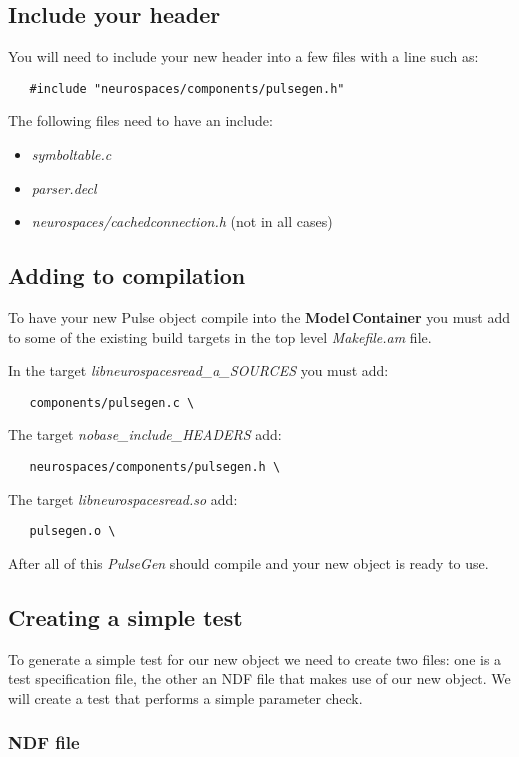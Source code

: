 \documentclass[12pt]{article}
\begin{document}
\subsection*{Include your header}

You will need to include your new header into a few files with a line such as:
\begin{verbatim}
   #include "neurospaces/components/pulsegen.h"
\end{verbatim}
The following files need to have an include:
\begin{itemize}
   \item[]{\it symboltable.c}
   \item[]{\it parser.decl}
   \item[]{\it neurospaces/cachedconnection.h} (not in all cases) 
\end{itemize}

\subsection*{Adding to compilation}

To have your new Pulse object compile into the {\bf Model\,Container} you must add to some of the existing build targets in the top level {\it Makefile.am} file.

In the target {\it libneurospacesread\_a\_SOURCES} you must add:
\begin{verbatim}
   components/pulsegen.c \
\end{verbatim}
The target {\it nobase\_include\_HEADERS} add:
\begin{verbatim}
   neurospaces/components/pulsegen.h \
\end{verbatim}
The target {\it libneurospacesread.so} add:
\begin{verbatim}
   pulsegen.o \
\end{verbatim}
After all of this {\it PulseGen} should compile and your new object is ready to use.

\subsection*{Creating a simple test}

To generate a simple test for our new object we need to create two files: one is a test specification file, the other an NDF file that makes use of our new object. We will create a test that performs a simple parameter check.

\subsubsection*{NDF file}
\end{document}

